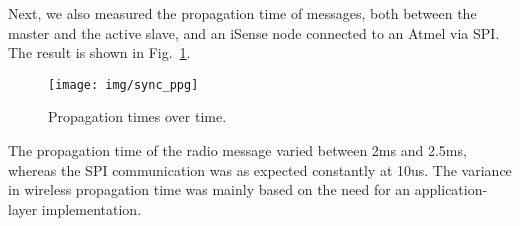Next, we also measured the propagation time of messages, both between
the master and the active slave, and an iSense node connected to an
Atmel via SPI. The result is shown in
Fig.~\ref{sec:exp:sync}.

\begin{figure}
  \centering
  \texttt{[image: img/sync\_ppg]}
  \caption{Propagation times over time.}
  \label{sec:exp:sync}
\end{figure}

The propagation time of the radio message varied between 2ms and
2.5ms, whereas the SPI communication was as expected constantly at
10us. The variance in wireless propagation time was mainly based on
the need for an application-layer implementation.





